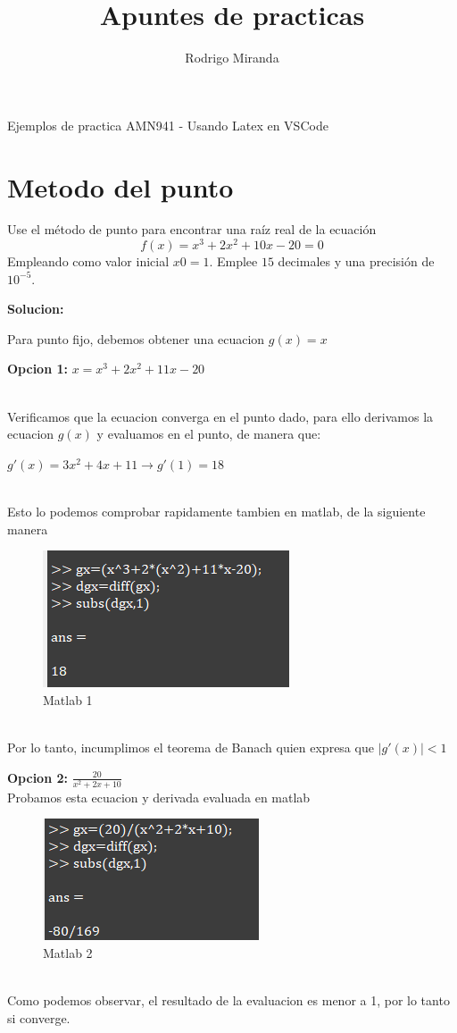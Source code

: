 \documentclass{article}
\title{Apuntes de practicas}
\author{Rodrigo Miranda}
\theoremstyle{mytheoremstyle}
\theoremstyle{mytheoremstyle}
\theoremstyle{myproblemstyle}
\begin{document}
    \maketitle
    Ejemplos de practica AMN941  - Usando Latex en VSCode
    \section*{Metodo del punto}Use el método de punto para encontrar una raíz real de la ecuación
    \[
        f(x)= x^{3}+2x^{2}+10x-20 =0
        \]
    Empleando como valor inicial $x0=1$. Emplee $15$ decimales y una precisión de $10^{-5}$.


    \textbf{Solucion:} 

    \noindent Para punto fijo, debemos obtener una ecuacion $g(x)=x$ 


    \textbf{Opcion 1:} $x= x^{3}+2x^{2}+11x-20$
    
    \noindent \\ Verificamos que la ecuacion converga en el punto dado, para ello derivamos la ecuacion $g(x)$ y evaluamos en el punto, de manera que:

    $g'(x)=3x^{2}+4x+11 \longrightarrow g'(1)=18$

    \noindent \\ Esto lo podemos comprobar rapidamente tambien en matlab, de la siguiente manera
    \begin{figure}[ht]
        \includegraphics[scale=1]{img/ejemplo_clasePunto.png}
        \caption[Derivada y evaluacion g'(x)]{Matlab 1}
    \end{figure}
    \\Por lo tanto, incumplimos el teorema de Banach quien expresa que $|g'(x)|<1$ \pagebreak
    
    \textbf{Opcion 2: }$\frac{20}{x^2+2x+10}$
    \noindent \\Probamos esta ecuacion y derivada evaluada en matlab
    \begin{figure}[ht]
        \includegraphics*[scale=0.9]{img/ejemplo_clasePunto_2.png}
        \caption[Derivada y evaluacion g'(x)]{Matlab 2}
    \end{figure}
    \\Como podemos observar, el resultado de la evaluacion es menor a 1, por lo tanto si converge.
\end{document}
